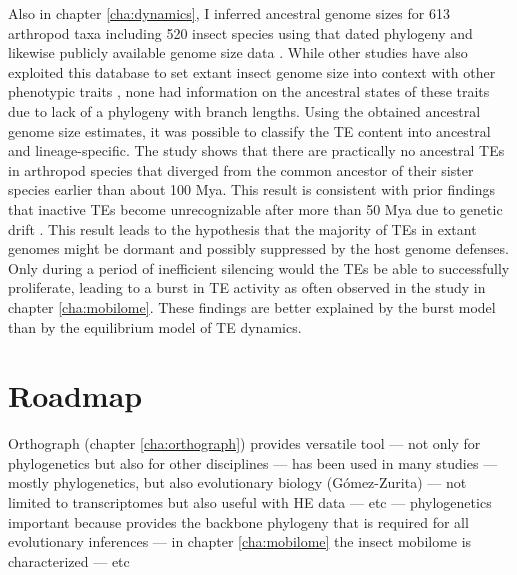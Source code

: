 Also in chapter \ref{cha:dynamics}, I inferred ancestral genome sizes
for 613 arthropod taxa including 520 insect species using that dated
phylogeny and likewise publicly available genome size data
\citep{Gregory2018}. While other studies have also exploited this
database to set extant insect genome size into context with other
phenotypic traits \citep{Alfsnes2017, Gregory2011}, none had information
on the ancestral states of these traits due to lack of a phylogeny with
branch lengths. Using the obtained ancestral genome size estimates, it
was possible to classify the TE content into ancestral and
lineage-specific. The study shows that there are practically no
ancestral TEs in arthropod species that diverged from the common
ancestor of their sister species earlier than about 100 Mya. This result
is consistent with prior findings that inactive TEs become
unrecognizable after more than 50 Mya due to genetic drift
\citep{Shedlock2000}. This result leads to the hypothesis that the
majority of TEs in extant genomes might be dormant and possibly
suppressed by the host genome defenses. Only during a period of
inefficient silencing would the TEs be able to successfully proliferate,
leading to a burst in TE activity as often observed in the study in
chapter \ref{cha:mobilome}. These findings are better explained by the
burst model than by the equilibrium model of TE dynamics.

\section{Roadmap}

Orthograph (chapter \ref{cha:orthograph}) provides versatile tool ---
not only for phylogenetics but also for other disciplines --- has been
used in many studies --- mostly phylogenetics, but also evolutionary
biology (Gómez-Zurita) --- not limited to transcriptomes but also useful
with HE data --- etc --- phylogenetics important because provides the
backbone phylogeny that is required for all evolutionary inferences ---
in chapter \ref{cha:mobilome} the insect mobilome is characterized ---
etc
